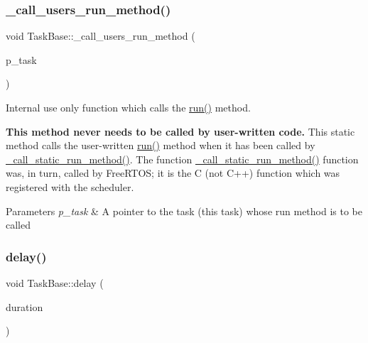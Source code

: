 \subsubsection{\texorpdfstring{\+\_\+call\+\_\+users\+\_\+run\+\_\+method()}{\_call\_users\_run\_method()}}
{\footnotesize\ttfamily void Task\+Base\+::\+\_\+call\+\_\+users\+\_\+run\+\_\+method (\begin{DoxyParamCaption}\item[{\mbox{\hyperlink{class_task_base}{Task\+Base}} $\ast$}]{p\+\_\+task }\end{DoxyParamCaption})\hspace{0.3cm}{\ttfamily [static]}}



Internal use only function which calls the {\ttfamily \mbox{\hyperlink{class_task_base_adcf6036ad9c860051ccf392ba5e7dbbc}{run()}}} method. 

{\bfseries This method never needs to be called by user-\/written code.} This {\ttfamily static} method calls the user-\/written {\ttfamily \mbox{\hyperlink{class_task_base_adcf6036ad9c860051ccf392ba5e7dbbc}{run()}}} method when it has been called by {\ttfamily \mbox{\hyperlink{taskbase_8cpp_abeff30a44eadf95fa24c7215cc6d7eae}{\+\_\+call\+\_\+static\+\_\+run\+\_\+method()}}}. The function {\ttfamily \mbox{\hyperlink{taskbase_8cpp_abeff30a44eadf95fa24c7215cc6d7eae}{\+\_\+call\+\_\+static\+\_\+run\+\_\+method()}}} function was, in turn, called by Free\+R\+T\+OS; it is the C (not C++) function which was registered with the scheduler. 
\begin{DoxyParams}{Parameters}
{\em p\+\_\+task} & A pointer to the task (this task) whose run method is to be called \\
\hline
\end{DoxyParams}
\mbox{\label{class_task_base_a06d9c962cc578a84a69ca637f6d5adef}} 
\subsubsection{\texorpdfstring{delay()}{delay()}}
{\footnotesize\ttfamily void Task\+Base\+::delay (\begin{DoxyParamCaption}\item[{Tick\+Type\+\_\+t}]{duration }\end{DoxyParamCaption})\hspace{0.3cm}{\ttfamily [inline]}}



